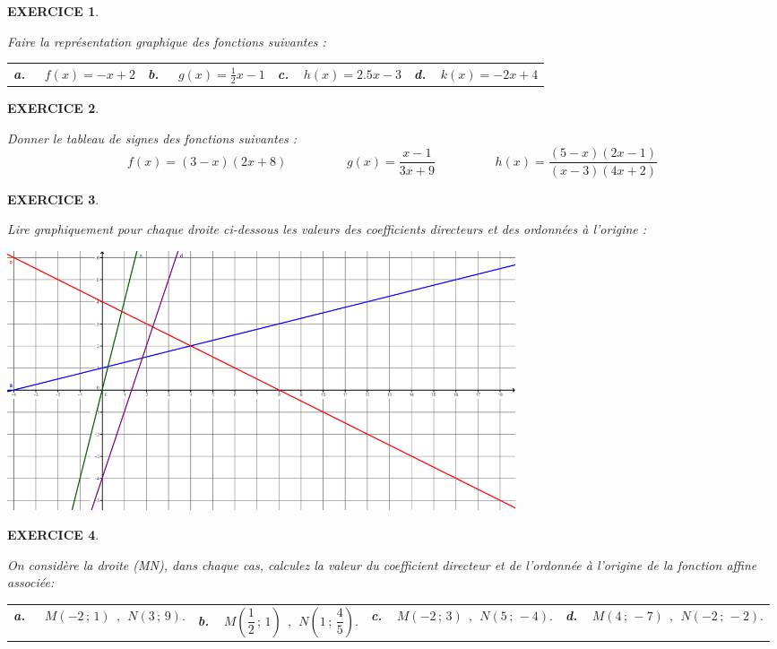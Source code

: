 \documentclass[a4paper]{article}   %
\renewcommand{\(}{\left(}
\renewcommand{\)}{\right)}
\newtheorem{EXO}{\large EXERCICE }
\newenvironment{EX}   { \setcounter{ques}{0} \begin{EXO} \hrulefill ~\vspace{0.3cm}

\normalfont}    {\end{EXO} \medskip}
\newcommand{\f}{\dfrac} 	%
\begin{document}
\begin{EX}
Faire la représentation graphique des fonctions suivantes :
\begin{center}\begin{tabular}{p{4cm} p{4cm}p{4cm}p{4cm}}
\textbf{a.~~} $f(x)=-x+2$&\textbf{b.~~} $g(x)=\displaystyle{\frac{1}{2}}x-1$&\textbf{c.~~}$h(x)=2.5x-3 $&\textbf{d.~~}$k(x)=-2x+4$\\
\end{tabular}\end{center}
\end{EX}
\begin{EX}
Donner le tableau de signes des fonctions suivantes :
$$f(x)=(3-x)(2x+8) \hspace{2cm} g(x)=\f{x-1}{3x+9} \hspace{2cm} h(x)=\f{(5-x)(2x-1)}{(x-3)(4x+2)}$$
\end{EX}
\begin{EX}
Lire graphiquement pour chaque droite ci-dessous les valeurs des coefficients directeurs et des ordonnées à l'origine :
\begin{center}
\includegraphics[width=15cm]{7exo.png}
\end{center}
\end{EX}
\begin{EX}
On considère la droite (MN), dans chaque cas, calculez la valeur du coefficient directeur et de l'ordonnée à l'origine de la fonction affine associée:
\begin{center}\begin{tabular}{p{4cm} p{4cm}p{4cm}p{4cm}}
\textbf{a.~~}  $ M(-2\,;\,1) ~~,~~  N(3\,;\,9). $&\textbf{b.~~}$ M(\f{1}{2} \,;\,1)~~,~~ N(1\,;\, \f{4}{5}). $&\textbf{c.~~}$ M(-2 \,;\,3)~~,~~ N(5 \,;\,-4). $&\textbf{d.~~}$ M(4 \,;\,-7)~~,~~ N(-2 \,;\,-2). $\\
\end{tabular}\end{center}\end{EX}
\end{document}
